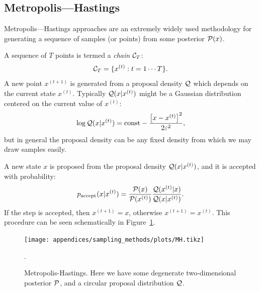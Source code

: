 \subsection{Metropolis---Hastings}
\label{sec:sm:mh}
Metropolis---Hastings approaches are an extremely widely used methodology for generating a sequence of samples (or points) from some posterior $\mathcal{P}(x)$.

A sequence of $T$ points is termed a {\em chain\/} $\mathcal{C}_T$:
\begin{equation}
  \mathcal{C}_T = \{ x^{(t)}: t=1\cdots T \}.
\end{equation}
A new point $x^{(t+1)}$ is generated from a proposal density $\mathcal{Q}$ which depends on the current state $x^{(t)}$. Typically $\mathcal{Q}(x|x^{(t)})$ might be a Gaussian distribution centered on the current value of $x^{(t)}$:
\begin{equation}
  \log \mathcal{Q}(x|x^{(t)}) = \text{const} -\frac{{\left[ x-x^{(t)} \right]}^2}{2\varepsilon^2},
\end{equation}
but in general the proposal density can be any fixed density from which we may draw samples easily.

A new state $x$ is proposed from the proposal density $\mathcal{Q}(x|x^{(t)})$, and it is accepted with probability:
\begin{equation}
  p_\mathrm{accept}(x|x^{(t)}) = \frac{\mathcal{P}(x)}{\mathcal{P}(x^{(t)})}\frac{\mathcal{Q}(x^{(t)}|x)}{\mathcal{Q}(x|x^{(t)})}.
\end{equation}
If the step is accepted, then $x^{(t+1)}=x$, otherwise $x^{(t+1)} = x^{(t)}$. This procedure can be seen schematically in Figure~\ref{fig:sm:MH}.
\begin{figure}[tp]
  \centering
  \texttt{[image: appendices/sampling\_methods/plots/MH.tikz]}
  \caption{Metropolis-Hastings. Here we have some degenerate two-dimensional posterior $\mathcal{P}$, and a circular proposal distribution $\mathcal{Q}$.\label{fig:sm:MH}}.
\end{figure}


